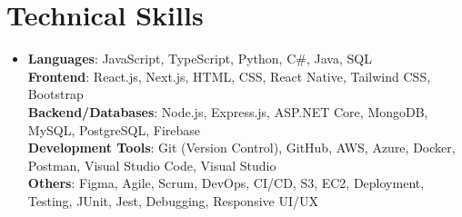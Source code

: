 \documentclass[letterpaper,11pt]{article}
\begin{document}
\section{Technical Skills} %
\begin{itemize}[leftmargin=0.15in, label={}]
\item{
\textbf{Languages}{: JavaScript, TypeScript, Python, C\#, Java, SQL} \\
\textbf{Frontend}{: React.js, Next.js, HTML, CSS, React Native, Tailwind CSS, Bootstrap} \\
\textbf{Backend/Databases}{: Node.js, Express.js, ASP.NET Core, MongoDB, MySQL, PostgreSQL, Firebase} \\
\textbf{Development Tools}{: Git (Version Control), GitHub, AWS, Azure, Docker, Postman, Visual Studio Code, Visual Studio} \\
\textbf{Others}{: Figma, Agile, Scrum, DevOps, CI/CD, S3, EC2, Deployment, Testing, JUnit, Jest, Debugging, Responsive UI/UX}
} \\
\end{itemize}


\end{document}
